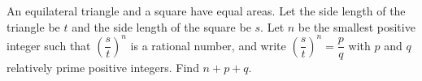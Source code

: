 An equilateral triangle and a square have equal areas. Let the side length of the triangle be $t$ and the side length of the square be $s$. Let $n$ be the smallest positive integer such that $\left(\dfrac{s}{t}\right)^n$ is a rational number, and write $\left(\dfrac{s}{t}\right)^n=\dfrac pq$ with $p$ and $q$ relatively prime positive integers. Find $n+p+q$.

